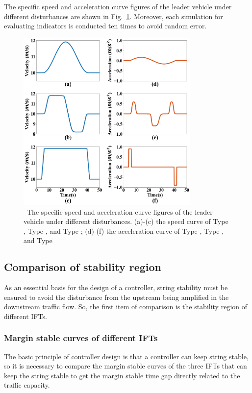 \documentclass[journal]{IEEEtran}
\begin{document}
The specific speed and acceleration curve figures of the leader vehicle under different disturbances are shown in Fig.~\ref{Figure5.2}. Moreover, each simulation for evaluating indicators is conducted ten times to avoid random error.

\begin{figure}
  \centering
  \includegraphics[width=9cm]{fig_S5.2.png}
  \caption{~The specific speed and acceleration curve figures of the leader vehicle under different disturbances. (a)-(c) the speed curve of {Type \uppercase\expandafter{}}, {Type \uppercase\expandafter{}}, and {Type \uppercase\expandafter{}}; (d)-(f) the acceleration curve of {Type \uppercase\expandafter{}}, {Type \uppercase\expandafter{}}, and {Type \uppercase\expandafter{}}}
  \label{Figure5.2}
\end{figure}


\subsection{Comparison of stability region}
\label{Section 5.2}
As an essential basis for the design of a controller, string stability must be ensured to avoid the disturbance from the upstream being amplified in the downstream traffic flow. So, the first item of comparison is the stability region of different IFTs.

\subsubsection{Margin stable curves of different IFTs}
\label{Section 5.2.1}
The basic principle of controller design is that a controller can keep string stable, so it is necessary to compare the margin stable curves of the three IFTs that can keep the string stable to get the margin stable time gap directly related to the traffic capacity.
\end{document}

